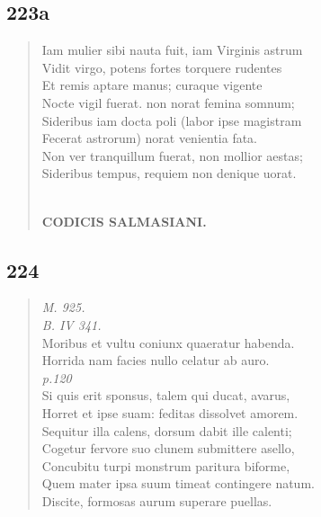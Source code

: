 \documentclass[11pt, a4paper]{report}
\begin{document}
            \subsection*{223a}
      \begin{verse}
      Iam mulier sibi nauta fuit, iam Virginis astrum \\ Vidit virgo, potens fortes torquere rudentes \\ Et remis aptare manus; curaque vigente \\ Nocte vigil fuerat. non norat femina somnum; \\ Sideribus iam docta poli (labor ipse magistram \\ Fecerat astrorum) norat venientia fata. \\ Non ver tranquillum fuerat, non mollior aestas; \\ Sideribus tempus, requiem non denique uorat. \\ 
        ﻿\pagebreak 
    \begin{center} \textbf{CODICIS SALMASIANI.} \end{center} \marginpar{[189]} 
      \end{verse}
  
            \subsection*{224}
      \begin{verse}
      \textit{M. 925.} \\ \textit{B. IV 341.} \\ Moribus et vultu coniunx quaeratur habenda. \\ Horrida nam facies nullo celatur ab auro. \\ \textit{p.120} \\ Si quis erit sponsus, talem qui ducat, avarus, \\ Horret et ipse suam: feditas dissolvet amorem. \\ Sequitur illa calens, dorsum dabit ille calenti; \\ Cogetur fervore suo clunem submittere asello, \\ Concubitu turpi monstrum paritura biforme, \\ Quem mater ipsa suum timeat contingere natum. \\ Discite, formosas aurum superare puellas. \\ 
      \end{verse}
  
\end{document}
